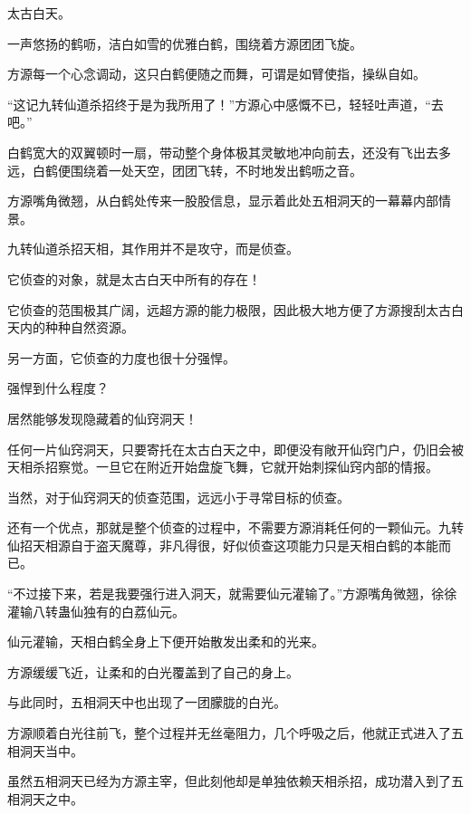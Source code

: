 
\begin{this_body}



太古白天。

一声悠扬的鹤呖，洁白如雪的优雅白鹤，围绕着方源团团飞旋。

方源每一个心念调动，这只白鹤便随之而舞，可谓是如臂使指，操纵自如。

“这记九转仙道杀招终于是为我所用了！”方源心中感慨不已，轻轻吐声道，“去吧。”

白鹤宽大的双翼顿时一扇，带动整个身体极其灵敏地冲向前去，还没有飞出去多远，白鹤便围绕着一处天空，团团飞转，不时地发出鹤呖之音。

方源嘴角微翘，从白鹤处传来一股股信息，显示着此处五相洞天的一幕幕内部情景。

九转仙道杀招天相，其作用并不是攻守，而是侦查。

它侦查的对象，就是太古白天中所有的存在！

它侦查的范围极其广阔，远超方源的能力极限，因此极大地方便了方源搜刮太古白天内的种种自然资源。

另一方面，它侦查的力度也很十分强悍。

强悍到什么程度？

居然能够发现隐藏着的仙窍洞天！

任何一片仙窍洞天，只要寄托在太古白天之中，即便没有敞开仙窍门户，仍旧会被天相杀招察觉。一旦它在附近开始盘旋飞舞，它就开始刺探仙窍内部的情报。

当然，对于仙窍洞天的侦查范围，远远小于寻常目标的侦查。

还有一个优点，那就是整个侦查的过程中，不需要方源消耗任何的一颗仙元。九转仙招天相源自于盗天魔尊，非凡得很，好似侦查这项能力只是天相白鹤的本能而已。

“不过接下来，若是我要强行进入洞天，就需要仙元灌输了。”方源嘴角微翘，徐徐灌输八转蛊仙独有的白荔仙元。

仙元灌输，天相白鹤全身上下便开始散发出柔和的光来。

方源缓缓飞近，让柔和的白光覆盖到了自己的身上。

与此同时，五相洞天中也出现了一团朦胧的白光。

方源顺着白光往前飞，整个过程并无丝毫阻力，几个呼吸之后，他就正式进入了五相洞天当中。

虽然五相洞天已经为方源主宰，但此刻他却是单独依赖天相杀招，成功潜入到了五相洞天之中。


\end{this_body}
